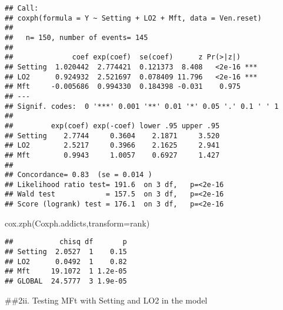 \documentclass[
]{article}
\newenvironment{Shaded}{\begin{snugshade}}{\end{snugshade}}
\newcommand{\AttributeTok}[1]{\textcolor[rgb]{0.77,0.63,0.00}{#1}}
\newcommand{\FunctionTok}[1]{\textcolor[rgb]{0.00,0.00,0.00}{#1}}
\newcommand{\NormalTok}[1]{#1}
\begin{document}
\begin{verbatim}
## Call:
## coxph(formula = Y ~ Setting + LO2 + Mft, data = Ven.reset)
## 
##   n= 150, number of events= 145 
## 
##              coef exp(coef)  se(coef)      z Pr(>|z|)    
## Setting  1.020442  2.774421  0.121373  8.408   <2e-16 ***
## LO2      0.924932  2.521697  0.078409 11.796   <2e-16 ***
## Mft     -0.005686  0.994330  0.184398 -0.031    0.975    
## ---
## Signif. codes:  0 '***' 0.001 '**' 0.01 '*' 0.05 '.' 0.1 ' ' 1
## 
##         exp(coef) exp(-coef) lower .95 upper .95
## Setting    2.7744     0.3604    2.1871     3.520
## LO2        2.5217     0.3966    2.1625     2.941
## Mft        0.9943     1.0057    0.6927     1.427
## 
## Concordance= 0.83  (se = 0.014 )
## Likelihood ratio test= 191.6  on 3 df,   p=<2e-16
## Wald test            = 157.5  on 3 df,   p=<2e-16
## Score (logrank) test = 176.1  on 3 df,   p=<2e-16
\end{verbatim}

\begin{Shaded}
\begin{Highlighting}[]
\FunctionTok{cox.zph}\NormalTok{(Coxph.addicts,}\AttributeTok{transform=}\NormalTok{rank)}
\end{Highlighting}
\end{Shaded}

\begin{verbatim}
##           chisq df       p
## Setting  2.0527  1    0.15
## LO2      0.0492  1    0.82
## Mft     19.1072  1 1.2e-05
## GLOBAL  24.5777  3 1.9e-05
\end{verbatim}

\#\#2ii. Testing MFt with Setting and LO2 in the model
\end{document}
